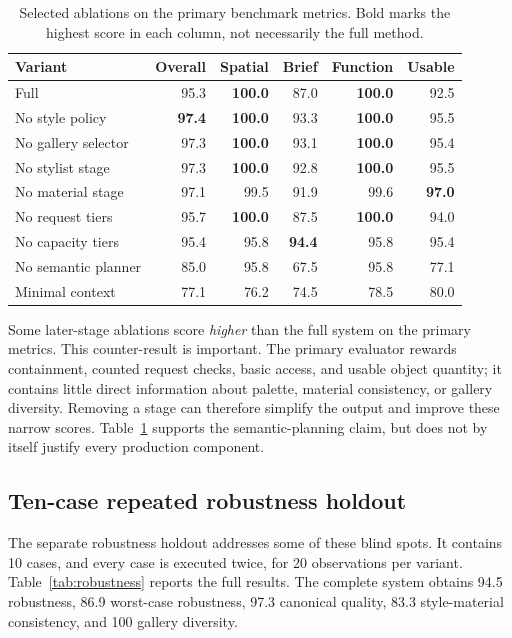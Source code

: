 \documentclass[pdflatex,sn-mathphys-num]{sn-jnl}
\begin{document}
\begin{table}[!t]
  \caption{Selected ablations on the primary benchmark metrics. Bold marks the highest score in each column, not necessarily the full method.}\label{tab:ablation}
  \centering
  \small
  \setlength{\tabcolsep}{4pt}
  \begin{tabular}{@{}lrrrrr@{}}
    \toprule
    Variant & Overall & Spatial & Brief & Function & Usable \\
    \midrule
    Full & 95.3 & \textbf{100.0} & 87.0 & \textbf{100.0} & 92.5 \\
    No style policy & \textbf{97.4} & \textbf{100.0} & 93.3 & \textbf{100.0} & 95.5 \\
    No gallery selector & 97.3 & \textbf{100.0} & 93.1 & \textbf{100.0} & 95.4 \\
    No stylist stage & 97.3 & \textbf{100.0} & 92.8 & \textbf{100.0} & 95.5 \\
    No material stage & 97.1 & 99.5 & 91.9 & 99.6 & \textbf{97.0} \\
    No request tiers & 95.7 & \textbf{100.0} & 87.5 & \textbf{100.0} & 94.0 \\
    No capacity tiers & 95.4 & 95.8 & \textbf{94.4} & 95.8 & 95.4 \\
    No semantic planner & 85.0 & 95.8 & 67.5 & 95.8 & 77.1 \\
    Minimal context & 77.1 & 76.2 & 74.5 & 78.5 & 80.0 \\
    \bottomrule
  \end{tabular}
\end{table}

Some later-stage ablations score \emph{higher} than the full system on the primary metrics. This counter-result is important. The primary evaluator rewards containment, counted request checks, basic access, and usable object quantity; it contains little direct information about palette, material consistency, or gallery diversity. Removing a stage can therefore simplify the output and improve these narrow scores. Table~\ref{tab:ablation} supports the semantic-planning claim, but does not by itself justify every production component.

\subsection{Ten-case repeated robustness holdout}

The separate robustness holdout addresses some of these blind spots. It contains 10 cases, and every case is executed twice, for 20 observations per variant. Table~\ref{tab:robustness} reports the full results. The complete system obtains 94.5 robustness, 86.9 worst-case robustness, 97.3 canonical quality, 83.3 style-material consistency, and 100 gallery diversity.
\end{document}
